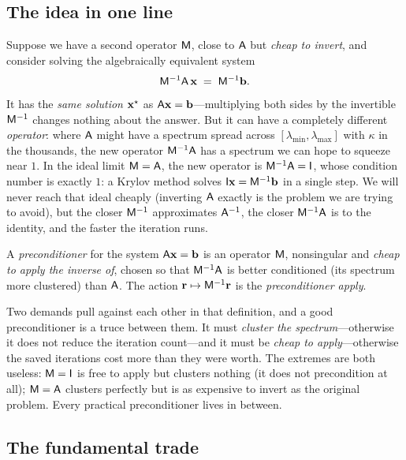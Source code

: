 \subsection{The idea in one line}

Suppose we have a second operator $\mathsf{M}$, close to $\mathsf{A}$ but \emph{cheap to
invert}, and consider solving the algebraically equivalent system
\begin{equation}
\label{eq:precond-system}
  \mathsf{M}^{-1}\mathsf{A}\,\mathbf{x} \;=\; \mathsf{M}^{-1}\mathbf{b} .
\end{equation}
It has the \emph{same solution} $\mathbf{x}^\star$ as $\mathsf{A}\mathbf{x}=\mathbf{b}$---multiplying both sides
by the invertible $\mathsf{M}^{-1}$ changes nothing about the answer. But it can have a
completely different \emph{operator}: where $\mathsf{A}$ might have a spectrum spread across
$[\lambda_{\min},\lambda_{\max}]$ with $\kappa$ in the thousands, the new operator
$\mathsf{M}^{-1}\mathsf{A}$ has a spectrum we can hope to squeeze near $1$. In the ideal limit
$\mathsf{M}=\mathsf{A}$, the new operator is $\mathsf{M}^{-1}\mathsf{A}=\mathsf{I}$, whose condition
number is exactly $1$: a Krylov method solves $\mathsf{I}\mathbf{x}=\mathsf{M}^{-1}\mathbf{b}$ in a single
step. We will never reach that ideal cheaply (inverting $\mathsf{A}$ exactly is the problem
we are trying to avoid), but the closer $\mathsf{M}^{-1}$ approximates $\mathsf{A}^{-1}$, the
closer $\mathsf{M}^{-1}\mathsf{A}$ is to the identity, and the faster the iteration runs.

\begin{definition}[Preconditioner]
\label{def:precond}
A \emph{preconditioner} for the system $\mathsf{A}\mathbf{x}=\mathbf{b}$ is an operator $\mathsf{M}$,
nonsingular and \emph{cheap to apply the inverse of}, chosen so that
$\mathsf{M}^{-1}\mathsf{A}$ is better conditioned (its spectrum more clustered) than
$\mathsf{A}$. The action $\mathbf{r}\mapsto\mathsf{M}^{-1}\mathbf{r}$ is the \emph{preconditioner apply}.
\end{definition}

Two demands pull against each other in that definition, and a good preconditioner is a
truce between them. It must \emph{cluster the spectrum}---otherwise it does not reduce
the iteration count---and it must be \emph{cheap to apply}---otherwise the saved
iterations cost more than they were worth. The extremes are both useless:
$\mathsf{M}=\mathsf{I}$ is free to apply but clusters nothing (it does not precondition at
all); $\mathsf{M}=\mathsf{A}$ clusters perfectly but is as expensive to invert as the original
problem. Every practical preconditioner lives in between.

\subsection{The fundamental trade}
\label{sec:trade}

